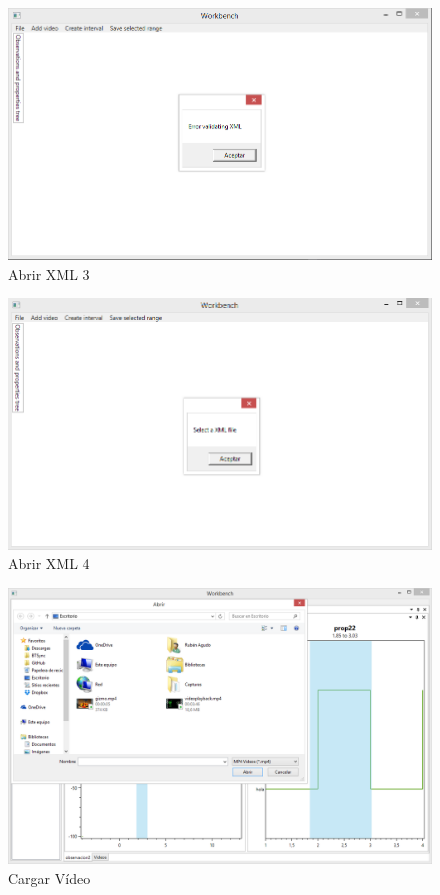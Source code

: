 \begin{figure}[H]
\centering
\includegraphics[width=0.9\linewidth]{./Figures/Capturas/AbrirXML3.PNG}
\caption{Abrir XML 3}
\label{fig:AbrirXML3}
\end{figure}

\begin{figure}[H]
\centering
\includegraphics[width=0.9\linewidth]{./Figures/Capturas/AbrirXML4.PNG}
\caption{Abrir XML 4}
\label{fig:AbrirXML4}
\end{figure}

\begin{figure}[H]
\centering
\includegraphics[width=0.9\linewidth]{./Figures/Capturas/CargarVideo.PNG}
\caption{Cargar V\'ideo}
\label{fig:CargarVideo}
\end{figure}

